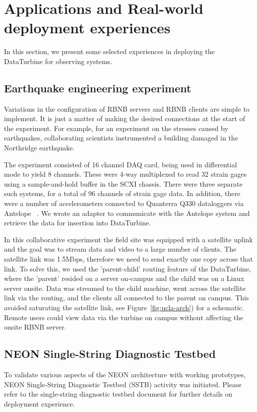 \section{Applications and Real-world deployment experiences} \label{sec:rbnb-apps-experiences}

In this section, we present some selected experiences in deploying the DataTurbine for observing systems. 

\subsection{Earthquake engineering experiment}
Variations in the configuration of RBNB servers and RBNB clients are simple to implement. It is just a matter of making the desired connections at the start of the experiment. For example, %
for an experiment on the stresses caused by earthquakes, collaborating scientists
instrumented a building  damaged in the Northridge earthquake.  

The experiment consisted of 16 channel DAQ card, being used in differential mode to yield 8 channels. These were 4-way multiplexed to read 32 strain gages using a sample-and-hold buffer in the SCXI chassis. There were three separate such systems, for a total of 96 channels of strain gage data. In addition, there were a number of accelerometers connected to Quanterra Q330 dataloggers via Antelope ~\cite{BRTT}. We wrote an adapter to communicate with the Antelope system and retrieve the data for insertion into DataTurbine.

In this collaborative experiment the field site was equipped with a satellite uplink and the goal was to stream data and video to a large number of clients. The satellite link was 1.5Mbps, therefore we need to send exactly one copy across that link. To solve this, we used the 'parent-child' routing feature of the DataTurbine, where the 'parent' resided on a server on-campus and the child was on a Linux server onsite. Data was streamed to the child machine, went across the satellite link via the routing, and the clients all connected to the parent on campus. This avoided saturating the satellite link, see Figure~\ref{fig:ucla-arch}) for a schematic. Remote users could view data via the turbine on campus without affecting the onsite RBNB server.



\subsection{NEON Single-String Diagnostic Testbed}

To validate various aspects of the NEON architecture with working prototypes, 
NEON Single-String Diagnostic Testbed (SSTB) activity was initiated. Please 
refer to the single-string diagnostic testbed document for further details on
deployment experience.

% 


